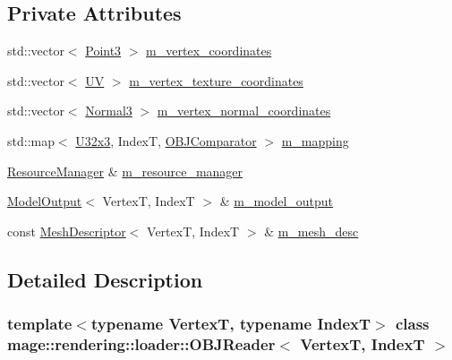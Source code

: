 \subsection*{Private Attributes}
\begin{DoxyCompactItemize}
\item 
std\+::vector$<$ \mbox{\hyperlink{structmage_1_1_point3}{Point3}} $>$ \mbox{\hyperlink{classmage_1_1rendering_1_1loader_1_1_o_b_j_reader_a393e0932f169a786e38f120fc6f0d84b}{m\+\_\+vertex\+\_\+coordinates}}
\item 
std\+::vector$<$ \mbox{\hyperlink{structmage_1_1_u_v}{UV}} $>$ \mbox{\hyperlink{classmage_1_1rendering_1_1loader_1_1_o_b_j_reader_aed919290e638cbe00a9144fdcb652178}{m\+\_\+vertex\+\_\+texture\+\_\+coordinates}}
\item 
std\+::vector$<$ \mbox{\hyperlink{structmage_1_1_normal3}{Normal3}} $>$ \mbox{\hyperlink{classmage_1_1rendering_1_1loader_1_1_o_b_j_reader_ac977ade8154bef446524526e8297f3eb}{m\+\_\+vertex\+\_\+normal\+\_\+coordinates}}
\item 
std\+::map$<$ \mbox{\hyperlink{namespacemage_a03e3b6f65630005f43a3112d1f6cf57b}{U32x3}}, IndexT, \mbox{\hyperlink{structmage_1_1rendering_1_1loader_1_1_o_b_j_reader_1_1_o_b_j_comparator}{O\+B\+J\+Comparator}} $>$ \mbox{\hyperlink{classmage_1_1rendering_1_1loader_1_1_o_b_j_reader_a4bad8aafabddb5cec68be8357d2d7566}{m\+\_\+mapping}}
\item 
\mbox{\hyperlink{classmage_1_1rendering_1_1_resource_manager}{Resource\+Manager}} \& \mbox{\hyperlink{classmage_1_1rendering_1_1loader_1_1_o_b_j_reader_ae6208964e05f3e93eb9939942fe3b55c}{m\+\_\+resource\+\_\+manager}}
\item 
\mbox{\hyperlink{structmage_1_1rendering_1_1_model_output}{Model\+Output}}$<$ VertexT, IndexT $>$ \& \mbox{\hyperlink{classmage_1_1rendering_1_1loader_1_1_o_b_j_reader_a645fca7c3f7f9860cb879f4088c4f8fc}{m\+\_\+model\+\_\+output}}
\item 
const \mbox{\hyperlink{classmage_1_1rendering_1_1_mesh_descriptor}{Mesh\+Descriptor}}$<$ VertexT, IndexT $>$ \& \mbox{\hyperlink{classmage_1_1rendering_1_1loader_1_1_o_b_j_reader_aa029c035456ea9456d63726b15e5db05}{m\+\_\+mesh\+\_\+desc}}
\end{DoxyCompactItemize}


\subsection{Detailed Description}
\subsubsection*{template$<$typename VertexT, typename IndexT$>$\newline
class mage\+::rendering\+::loader\+::\+O\+B\+J\+Reader$<$ Vertex\+T, Index\+T $>$}

